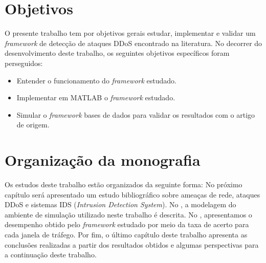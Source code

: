\section{Objetivos}
O presente trabalho tem por objetivos gerais estudar, implementar e validar um \textit{framework} de detecção de ataques DDoS encontrado na literatura. No decorrer do desenvolvimento deste trabalho, os seguintes objetivos específicos foram perseguidos:
\begin{itemize}
	\item Entender o funcionamento do \textit{framework} estudado.
	\item Implementar em MATLAB o \textit{framework} estudado.
	\item Simular o \textit{framework} bases de dados para validar os resultados com o artigo de origem.
\end{itemize}
\section{Organização da monografia}
Os estudos deste trabalho estão organizados da seguinte forma: No próximo capítulo será apresentado um estudo bibliográfico sobre ameaças de rede, ataques DDoS e sistemas IDS (\textit{Intrusion Detection System}). No , a modelagem do ambiente de simulação utilizado neste trabalho é descrita. No , apresentamos o desempenho obtido pelo \textit{framework} estudado por meio da taxa de acerto para cada janela de tráfego. Por fim, o último capítulo deste trabalho apresenta as conclusões realizadas a partir dos resultados obtidos e algumas perspectivas para a continuação deste trabalho. 